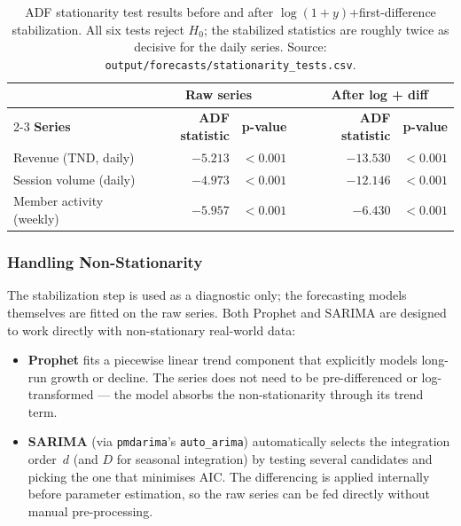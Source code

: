\begin{table}[H]
  \centering
  \begin{tabular}{lrrcrr}
    \hline
                                & \multicolumn{2}{c}{\textbf{Raw series}} & &
                                  \multicolumn{2}{c}{\textbf{After log + diff}} \\
    \cline{2-3} \cline{5-6}
    \textbf{Series}             & \textbf{ADF statistic} & \textbf{p-value} & &
                                  \textbf{ADF statistic} & \textbf{p-value} \\
    \hline
    Revenue (TND, daily)        & $-5.213$ & $<0.001$ & & $-13.530$ & $<0.001$ \\
    Session volume (daily)      & $-4.973$ & $<0.001$ & & $-12.146$ & $<0.001$ \\
    Member activity (weekly)    & $-5.957$ & $<0.001$ & &  $-6.430$ & $<0.001$ \\
    \hline
  \end{tabular}
  \caption{ADF stationarity test results before and after
           $\log(1+y)$+first-difference stabilization. All six tests reject
           $H_0$; the stabilized statistics are roughly twice as decisive for
           the daily series. Source:
           \texttt{output/forecasts/stationarity\_tests.csv}.%
           \label{tab:adf_results}}
\end{table}

\subsubsection*{Handling Non-Stationarity}

The stabilization step is used as a diagnostic only; the forecasting models
themselves are fitted on the raw series. Both Prophet and SARIMA are designed
to work directly with non-stationary real-world data:

\begin{itemize}
  \item \textbf{Prophet} fits a piecewise linear trend component that explicitly models
        long-run growth or decline. The series does not need to be pre-differenced or
        log-transformed --- the model absorbs the non-stationarity through its
        trend term.
  \item \textbf{SARIMA} (via \texttt{pmdarima}'s \texttt{auto\_arima}) automatically
        selects the integration order~$d$ (and $D$ for seasonal integration) by testing
        several candidates and picking the one that minimises AIC. The differencing is
        applied internally before parameter estimation, so the raw series can be fed
        directly without manual pre-processing.
\end{itemize}

